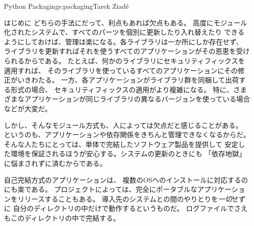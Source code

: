 \begin{aosachapter}{Python Packaging}{s:packaging}{Tarek Ziad\'{e}}
\begin{aosasect1}{はじめに}
どちらの手法にだって、利点もあれば欠点もある。
高度にモジュール化されたシステムで、すべてのパーツを個別に更新したり入れ替えたり
できるようにしておけば、管理は楽になる。各ライブラリは一か所にしか存在せず、
ライブラリを更新すればそれを使うすべてのアプリケーションがその恩恵を受けられるからである。
たとえば、何かのライブラリにセキュリティフィックスを適用すれば、
そのライブラリを使っているすべてのアプリケーションにその修正がいきわたる。
一方、各アプリケーションがライブラリ群を同梱して出荷する形式の場合、
セキュリティフィックスの適用がより複雑になる。
特に、さまざまなアプリケーションが同じライブラリの異なるバージョンを使っている場合などが大変だ。

しかし、そんなモジュール方式も、人によっては欠点だと感じることがある。
というのも、アプリケーションや依存関係をきちんと管理できなくなるからだ。
そんな人たちにとっては、単体で完結したソフトウェア製品を提供して
安定した環境を保証されるほうが安心する。システムの更新のときにも
「依存地獄」に悩まされずに済むからである。

自己完結方式のアプリケーションは、
複数のOSへのインストールに対応するのにも楽である。
プロジェクトによっては、完全にポータブルなアプリケーションをリリースすることもある。
導入先のシステムとの間のやりとりを\emph{一切}せずに
自分のディレクトリの中だけで動作するというものだ。
ログファイルでさえもこのディレクトリの中で完結する。


\end{aosasect1}
\end{aosachapter}
